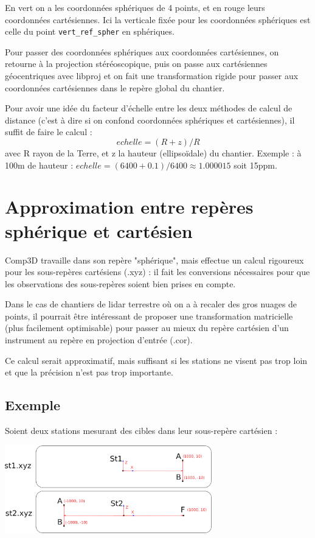 \documentclass[french]{report}
\begin{document}
En vert on a les coordonnées sphériques de 4 points, et en rouge leurs coordonnées cartésiennes.
Ici la verticale fixée pour les coordonnées sphériques est celle du point \texttt{vert\_ref\_spher} en sphériques.

Pour passer des coordonnées sphériques aux coordonnées cartésiennes, on retourne à la projection stéréoscopique,
puis on passe aux cartésiennes géocentriques avec libproj et on fait une transformation rigide pour passer aux
coordonnées cartésiennes dans le repère global du chantier.

Pour avoir une idée du facteur d'échelle entre les deux méthodes de calcul de distance
(c'est à dire si on confond coordonnées sphériques et cartésiennes), il suffit de faire le calcul :
$$ echelle = (R + z) / R $$
avec R rayon de la Terre, et z la hauteur (ellipsoïdale) du chantier.
Exemple : à 100m de hauteur : $echelle = (6400+0.1)/6400 \approx 1.000015$ soit 15ppm.




\section{Approximation entre repères sphérique et cartésien}

Comp3D travaille dans son repère "sphérique", mais effectue un calcul rigoureux
pour les sous-repères cartésiens (.xyz) : il fait les conversions nécessaires pour
que les observations des sous-repères soient bien prises en compte.

Dans le cas de chantiers de lidar terrestre où on a à recaler des gros nuages
de points, il pourrait être intéressant de proposer une transformation matricielle
(plus facilement optimisable) pour passer au mieux du repère cartésien d'un instrument
au repère en projection d'entrée (.cor).

Ce calcul serait approximatif, mais suffisant si les stations ne visent pas trop
loin et que la précision n'est pas trop importante.


\subsection{Exemple}
Soient deux stations mesurant des cibles dans leur sous-repère cartésien :
\begin{center}
\includegraphics[width = 9cm]{images/ex_approx_spher_xyz_local}
\end{center}
\end{document}
